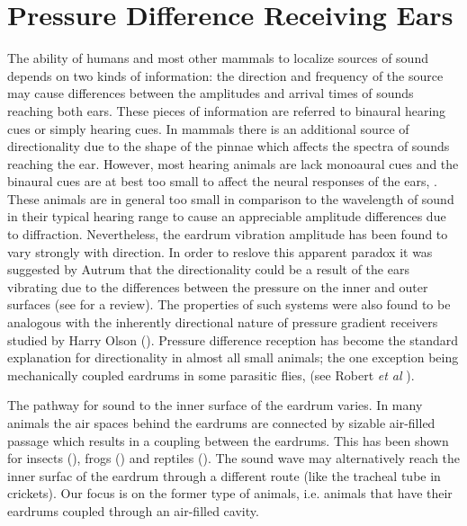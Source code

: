 \section{Pressure Difference Receiving Ears}\label{iceintrosection}
The ability of humans and most other mammals to localize sources of sound depends on two kinds of information: the direction and frequency
of the source may cause differences between the amplitudes and arrival times of sounds reaching both ears. These pieces of information are
referred to binaural hearing cues or simply hearing cues. In mammals there is an additional source of directionality due to the shape
of the pinnae which affects the spectra of sounds reaching the ear. However, most hearing animals are lack monoaural cues and the binaural
cues are at best too small to affect the neural responses of the ears, \cite{michelsen1}. These animals are in general too small in comparison
to the wavelength of sound in their typical hearing range to cause an appreciable amplitude differences due to diffraction. Nevertheless, 
the eardrum vibration amplitude has been found to vary strongly with direction. In order to reslove this apparent paradox it was
suggested by Autrum \cite{autrumjcomphys} that the directionality could be a result of the ears vibrating due to the
differences between the pressure on the inner and outer surfaces (see \cite{michelsenlarsen} for a review).  The properties of such systems were also found to be analogous with the inherently directional 
nature of pressure gradient receivers studied by Harry Olson (\cite{olsonmichrophones}). Pressure difference reception has
become the standard explanation for directionality in almost all small animals; the one exception being mechanically coupled
eardrums in some parasitic flies, (see Robert \emph{et al} \cite{roberthoy}).

The pathway for sound to the inner surface of the eardrum varies. In many animals the air spaces behind the eardrums are
connected by sizable air-filled passage which results in a coupling between the eardrums. This has been shown for 
insects (\cite{michelsenbiophysics}), frogs (\cite{jorgensenanurans}) and reptiles (\cite{dalsgaardmanley1}). The sound wave
may alternatively reach the inner surfac of the eardrum through a different route (like the tracheal tube in crickets). Our focus
is on the former type of animals, i.e. animals that have their eardrums coupled through an air-filled cavity.

